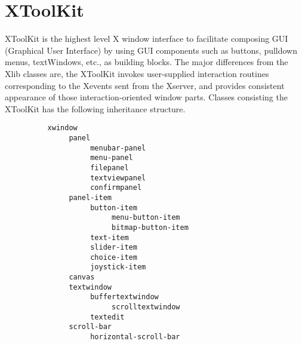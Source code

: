 \newpage
\section{XToolKit}

XToolKit is the highest level X window interface to facilitate composing
GUI (Graphical User Interface) by using GUI components such as
buttons, pulldown menus, textWindows, etc., as building blocks.
The major differences from the Xlib classes are,
the XToolKit invokes user-supplied interaction routines
corresponding to the Xevents sent from the Xserver,
and provides consistent appearance of those interaction-oriented
window parts.
Classes consisting the XToolKit has the following inheritance structure.
\begin{verbatim}
          xwindow
               panel
                    menubar-panel
                    menu-panel
                    filepanel
                    textviewpanel
                    confirmpanel
               panel-item
                    button-item
                         menu-button-item
                         bitmap-button-item
                    text-item
                    slider-item
                    choice-item
                    joystick-item
               canvas
               textwindow
                    buffertextwindow
                         scrolltextwindow
                    textedit
               scroll-bar
                    horizontal-scroll-bar
\end{verbatim}

